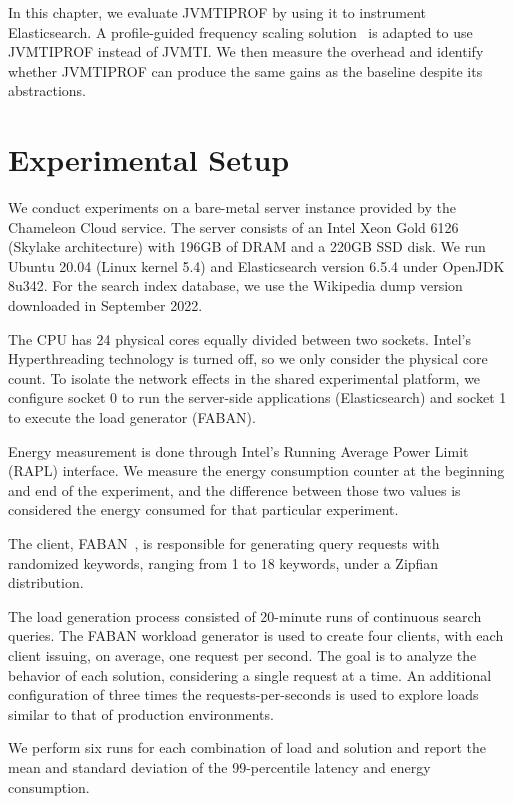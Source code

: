 \label{cap:evaluation}

In this chapter, we evaluate JVMTIPROF by using it to instrument Elasticsearch. A profile-guided frequency scaling solution~\cite{hurryupccgrid} is adapted to use JVMTIPROF instead of JVMTI. We then measure the overhead and identify whether JVMTIPROF can produce the same gains as the baseline despite its abstractions.

\section{Experimental Setup}

We conduct experiments on a bare-metal server instance provided by the Chameleon Cloud service. The server consists of an Intel Xeon Gold 6126 (Skylake architecture) with 196GB of DRAM and a 220GB SSD disk. We run Ubuntu 20.04 (Linux kernel 5.4) and Elasticsearch version 6.5.4 under OpenJDK 8u342. For the search index database, we use the Wikipedia dump version  downloaded in September 2022.

The CPU has 24 physical cores equally divided between two sockets. Intel's Hyperthreading technology is turned off, so we only consider the physical core count. To isolate the network effects in the shared experimental platform, we configure socket 0 to run the server-side applications (Elasticsearch) and socket 1 to execute the load generator (FABAN).

Energy measurement is done through Intel's Running Average Power Limit (RAPL) interface. We measure the energy consumption counter at the beginning and end of the experiment, and the difference between those two values is considered the energy consumed for that particular experiment.

The client, FABAN~\cite{faban}, is responsible for generating query requests with randomized keywords, ranging from 1 to 18 keywords, under a Zipfian distribution.

The load generation process consisted of 20-minute runs of continuous search queries. The FABAN workload generator is used to create four clients, with each client issuing, on average, one request per second. The goal is to analyze the behavior of each solution, considering a single request at a time. An additional configuration of three times the requests-per-seconds is used to explore loads similar to that of production environments.

We perform six runs for each combination of load and solution and report the mean and standard deviation of the 99-percentile latency and energy consumption.

